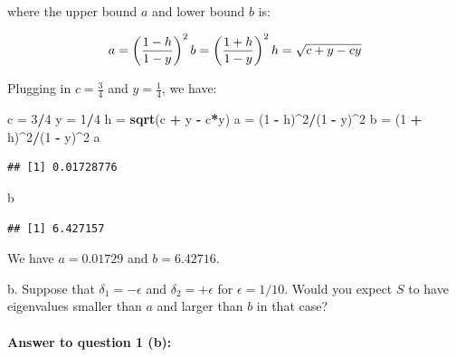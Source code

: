\documentclass[
]{article}
\newenvironment{Shaded}{\begin{snugshade}}{\end{snugshade}}
\newcommand{\DecValTok}[1]{\textcolor[rgb]{0.00,0.00,0.81}{#1}}
\newcommand{\FunctionTok}[1]{\textcolor[rgb]{0.13,0.29,0.53}{\textbf{#1}}}
\newcommand{\NormalTok}[1]{#1}
\newcommand{\OtherTok}[1]{\textcolor[rgb]{0.56,0.35,0.01}{#1}}
\newcommand{\SpecialCharTok}[1]{\textcolor[rgb]{0.81,0.36,0.00}{\textbf{#1}}}
\begin{document}
where the upper bound \(a\) and lower bound \(b\) is:

\[
a = \left( \frac{1 - h}{1 - y} \right)^2 \\
b = \left( \frac{1 + h}{1 - y} \right)^2 \\
h = \sqrt{c + y - cy}
\]

Plugging in \(c = \frac{3}{4}\) and \(y = \frac{1}{4}\), we have:

\begin{Shaded}
\begin{Highlighting}[]
\NormalTok{c }\OtherTok{=} \DecValTok{3}\SpecialCharTok{/}\DecValTok{4}
\NormalTok{y }\OtherTok{=} \DecValTok{1}\SpecialCharTok{/}\DecValTok{4}
\NormalTok{h }\OtherTok{=} \FunctionTok{sqrt}\NormalTok{(c }\SpecialCharTok{+}\NormalTok{ y }\SpecialCharTok{{-}}\NormalTok{ c}\SpecialCharTok{*}\NormalTok{y)}
\NormalTok{a }\OtherTok{=}\NormalTok{ (}\DecValTok{1} \SpecialCharTok{{-}}\NormalTok{ h)}\SpecialCharTok{\^{}}\DecValTok{2}\SpecialCharTok{/}\NormalTok{(}\DecValTok{1} \SpecialCharTok{{-}}\NormalTok{ y)}\SpecialCharTok{\^{}}\DecValTok{2}
\NormalTok{b }\OtherTok{=}\NormalTok{ (}\DecValTok{1} \SpecialCharTok{+}\NormalTok{ h)}\SpecialCharTok{\^{}}\DecValTok{2}\SpecialCharTok{/}\NormalTok{(}\DecValTok{1} \SpecialCharTok{{-}}\NormalTok{ y)}\SpecialCharTok{\^{}}\DecValTok{2}
\NormalTok{a}
\end{Highlighting}
\end{Shaded}

\begin{verbatim}
## [1] 0.01728776
\end{verbatim}

\begin{Shaded}
\begin{Highlighting}[]
\NormalTok{b}
\end{Highlighting}
\end{Shaded}

\begin{verbatim}
## [1] 6.427157
\end{verbatim}

We have \(a = 0.01729\) and \(b = 6.42716\).

b. Suppose that \(\delta_1 = −\epsilon\) and \(\delta_2 = +\epsilon\)
for \(\epsilon = 1/10\). Would you expect \(S\) to have eigenvalues
smaller than \(a\) and larger than \(b\) in that case?

\paragraph{\texorpdfstring{\textbf{Answer to question 1
(b)}:}{Answer to question 1 (b):}}\label{answer-to-question-1-b}
\end{document}
